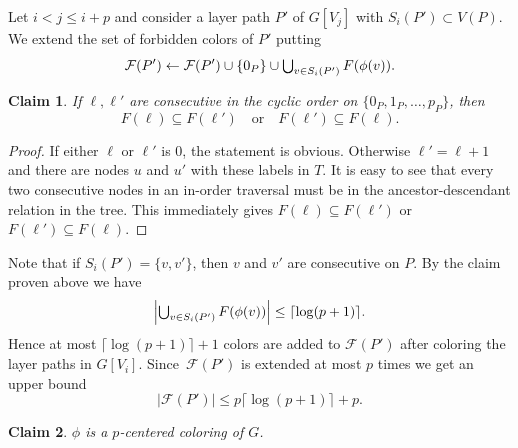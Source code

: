 \documentclass[11pt]{article}
\newtheorem*{klaim}{Claim}
\begin{document}
Let $i<j\leq i+p$ and consider a layer path $P'$ of $G[V_j]$ with 
$S_i(P') \subset V(P)$.
We extend the set of forbidden colors of $P'$ putting
\[
  \mathcal{F}(P') \gets \mathcal{F}(P') \cup \{0_P\} \cup \hbox{$\bigcup_{v\in S_i(P')} F(\phi(v))$}.
\]
 \begin{klaim}\label{claim_inorder}
If $\ell,\ell'$ are consecutive in the cyclic order on $\{0_P,1_P,\ldots,p_P\}$, then
\[F(\ell)\subseteq F(\ell')\quad\textrm{or}\quad F(\ell')\subseteq F(\ell).
\]
 \end{klaim}
\begin{proof}
  If either $\ell$ or $\ell'$ is $0$, the statement is obvious.
  Otherwise $\ell'=\ell+1$ and there are nodes $u$ and $u'$ with these
  labels in $T$. 
  It is easy to see that every two consecutive nodes in an in-order traversal 
  must be in the ancestor-descendant relation in the tree.
  This immediately gives $F(\ell)\subseteq F(\ell')$ or $F(\ell')\subseteq F(\ell)$.
\end{proof}
Note that if $S_i(P')=\{v,v'\}$, then $v$ and $v'$ are consecutive on $P$.
By the claim proven above we have
\[
\left|\hbox{$\bigcup_{v\in S_i(P')} F(\phi(v))$}\right| \leq \lceil\log(p+1)\rceil.
\]
Hence at most $\lceil\log(p+1)\rceil + 1$ colors are added to $\mathcal{F}(P')$
after coloring the layer paths in $G[V_i]$.
Since~$\mathcal{F}(P')$ is extended at most $p$ times we get an upper bound
\[
|\mathcal{F}(P')| \leq p\lceil\log(p+1)\rceil + p.
\]
\begin{klaim}
  $\phi$ is a $p$-centered coloring of $G$.
\end{klaim}
\end{document}
